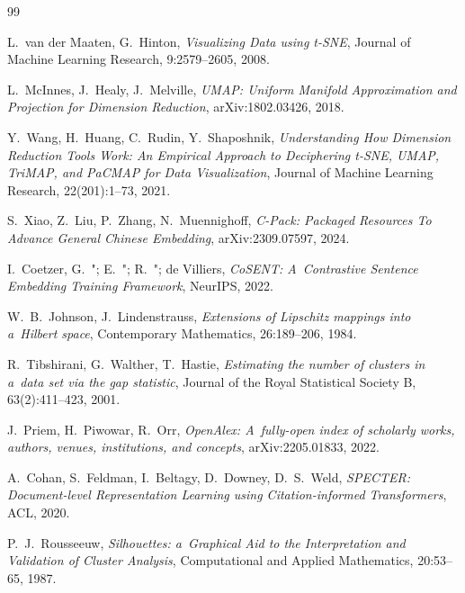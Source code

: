\documentclass[a4paper,11pt,twocolumn]{article}
\begin{document}
\small
\begin{thebibliography}{99}

L.~van der Maaten, G.~Hinton,
\emph{Visualizing Data using t-SNE},
Journal of Machine Learning Research, 9:2579--2605, 2008.

L.~McInnes, J.~Healy, J.~Melville,
\emph{UMAP: Uniform Manifold Approximation and Projection
for Dimension Reduction},
arXiv:1802.03426, 2018.

Y.~Wang, H.~Huang, C.~Rudin, Y.~Shaposhnik,
\emph{Understanding How Dimension Reduction Tools Work:
An Empirical Approach to Deciphering t-SNE, UMAP, TriMAP,
and PaCMAP for Data Visualization},
Journal of Machine Learning Research, 22(201):1--73, 2021.

S.~Xiao, Z.~Liu, P.~Zhang, N.~Muennighoff,
\emph{C-Pack: Packaged Resources To Advance General
Chinese Embedding},
arXiv:2309.07597, 2024.

I.~Coetzer, G.~"; E.~"; R.~"; de Villiers,
\emph{CoSENT: A~Contrastive Sentence Embedding Training
Framework},
NeurIPS, 2022.

W.~B.~Johnson, J.~Lindenstrauss,
\emph{Extensions of Lipschitz mappings into a~Hilbert space},
Contemporary Mathematics, 26:189--206, 1984.

R.~Tibshirani, G.~Walther, T.~Hastie,
\emph{Estimating the number of clusters in a~data set via
the gap statistic},
Journal of the Royal Statistical Society B, 63(2):411--423, 2001.

J.~Priem, H.~Piwowar, R.~Orr,
\emph{OpenAlex: A~fully-open index of scholarly works, authors,
venues, institutions, and concepts},
arXiv:2205.01833, 2022.

A.~Cohan, S.~Feldman, I.~Beltagy, D.~Downey, D.~S.~Weld,
\emph{SPECTER: Document-level Representation Learning using
Citation-informed Transformers},
ACL, 2020.

P.~J.~Rousseeuw,
\emph{Silhouettes: a~Graphical Aid to the Interpretation
and Validation of Cluster Analysis},
Computational and Applied Mathematics, 20:53--65, 1987.

\end{thebibliography}
\end{document}
